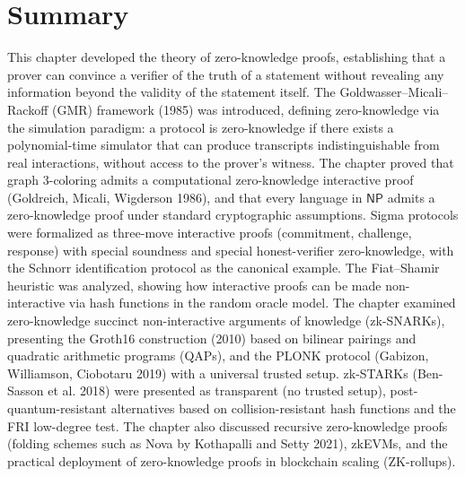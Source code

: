 \section{Summary}
\label{sec:zk:summary}

This chapter developed the theory of zero-knowledge proofs, establishing that a prover can convince a verifier of the truth of a statement without revealing any information beyond the validity of the statement itself. The Goldwasser--Micali--Rackoff (GMR) framework (1985) was introduced, defining zero-knowledge via the simulation paradigm: a protocol is zero-knowledge if there exists a polynomial-time simulator that can produce transcripts indistinguishable from real interactions, without access to the prover's witness. The chapter proved that graph 3-coloring admits a computational zero-knowledge interactive proof (Goldreich, Micali, Wigderson 1986), and that every language in $\mathsf{NP}$ admits a zero-knowledge proof under standard cryptographic assumptions. Sigma protocols were formalized as three-move interactive proofs (commitment, challenge, response) with special soundness and special honest-verifier zero-knowledge, with the Schnorr identification protocol as the canonical example. The Fiat--Shamir heuristic was analyzed, showing how interactive proofs can be made non-interactive via hash functions in the random oracle model. The chapter examined zero-knowledge succinct non-interactive arguments of knowledge (zk-SNARKs), presenting the Groth16 construction (2010) based on bilinear pairings and quadratic arithmetic programs (QAPs), and the PLONK protocol (Gabizon, Williamson, Ciobotaru 2019) with a universal trusted setup. zk-STARKs (Ben-Sasson et al. 2018) were presented as transparent (no trusted setup), post-quantum-resistant alternatives based on collision-resistant hash functions and the FRI low-degree test. The chapter also discussed recursive zero-knowledge proofs (folding schemes such as Nova by Kothapalli and Setty 2021), zkEVMs, and the practical deployment of zero-knowledge proofs in blockchain scaling (ZK-rollups).


